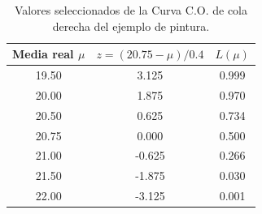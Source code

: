 \documentclass[11pt,a4paper]{article}
\begin{document}
\begin{table}[H]
\centering
\begin{tabular}{ccc}
\toprule
Media real $\mu$ & $z=(20.75-\mu)/0.4$ & $L(\mu)$\\
\midrule
19.50 & 3.125 & 0.999 \\
20.00 & 1.875 & 0.970 \\
20.50 & 0.625 & 0.734 \\
20.75 & 0.000 & 0.500 \\
21.00 & -0.625 & 0.266 \\
21.50 & -1.875 & 0.030 \\
22.00 & -3.125 & 0.001 \\
\bottomrule
\end{tabular}
\caption{Valores seleccionados de la Curva C.O. de cola derecha del ejemplo de pintura.}
\end{table}
\end{document}
